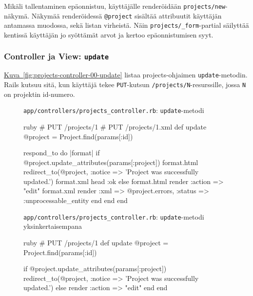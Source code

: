 \documentclass{article}
\newenvironment{myfigure}[1][tbp]{
  \begin{figure}[#1]
    \centering
    \begin{lrbox}{\myfigurebox}
      \begin{minipage}{\textwidth}
}{
      \end{minipage}
    \end{lrbox}
    \colorbox{blue!4}{\usebox{\myfigurebox}}
  \end{figure}
}
\newcommand{\myref}[2]{\hyperref[#2]{#1~\ref*{#2}}}
\newcommand{\pdfforeignlanguage}[2]{\texorpdfstring{\foreignlanguage{#1}{#2}}{#2}}
\newcommand{\eng}[1]{\pdfforeignlanguage{english}{#1}}
\begin{document}
Mikäli tallentaminen epäonnistuu, käyttäjälle renderöidään
\texttt{projects/new}-näkymä. Näkymää renderöidessä \texttt{@project} sisältää
attribuutit käyttäjän antamassa muodossa, sekä listan virheistä. Näin
\texttt{projects/\_form}-\eng{partial} säilyttää kentissä käyttäjän jo
syöttämät arvot ja kertoo epäonnistumisen syyt.

\subsubsection{\eng{Controller} ja \eng{View}: \texttt{update}}

\begin{samepage}
\myref{Kuva}{fig:projects-controller-00-update} listaa projects-ohjaimen
\texttt{update}-metodin. Rails kutsuu sitä, kun käyttäjä tekee
\texttt{PUT}-kutsun \texttt{/projects/N}-resurssille, jossa \texttt{N} on
projektin id-numero.

\begin{myfigure}[H]
\caption{\texttt{app/controllers/projects\_controller.rb}:
\texttt{update}-metodi}
\label{fig:projects-controller-00-update}

\begin{pygmented}{ruby}
  # PUT /projects/1
  # PUT /projects/1.xml
  def update
    @project = Project.find(params[:id])

    respond_to do |format|
      if @project.update_attributes(params[:project])
        format.html { redirect_to(@project, :notice => 'Project was successfully updated.') }
        format.xml  { head :ok }
      else
        format.html { render :action => "edit" }
        format.xml  { render :xml => @project.errors, :status => :unprocessable_entity }
      end
    end
  end
\end{pygmented}

\caption{\texttt{app/controllers/projects\_controller.rb}:
\texttt{update}-metodi yksinkertaisempana}
\label{fig:projects-controller-01-update}

\begin{pygmented}{ruby}
  # PUT /projects/1
  def update
    @project = Project.find(params[:id])

    if @project.update_attributes(params[:project])
      redirect_to(@project, :notice => 'Project was successfully updated.')
    else
      render :action => "edit"
    end
  end
\end{pygmented}
\end{myfigure}
\end{samepage}
\end{document}
